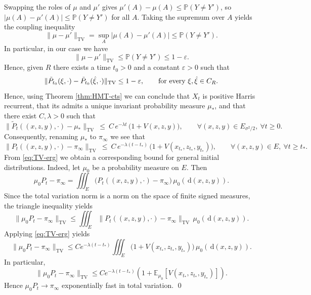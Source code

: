 \documentclass[11pt, a4paper,leqno]{amsart}
\theoremstyle{definition}
\numberwithin{equation}{section}
\def \d {{\delta}}
\renewcommand{\d}{\, \mathrm{d}} %
\begin{document}
Swapping the roles of $\mu$ and $\mu'$ gives $\mu'(A)-\mu(A)\le \mathbb P(Y\neq Y')$,
so $|\mu(A)-\mu'(A)|\le \mathbb P(Y\neq Y')$ for all $A$. Taking the supremum over
$A$ yields the coupling inequality
\[
\|\mu-\mu'\|_{\mathrm{TV}}
= \sup_{A} |\mu(A)-\mu'(A)|
\le \mathbb P(Y\neq Y').
\]
In particular, in our case we have
\[
\|\mu - \mu'\|_{\mathrm{TV}} \le \mathbb{P}(Y \neq Y') \le 1 - \varepsilon.
\]
Hence, given $R$ there  exists a time
\( t_0 > 0 \) and a constant \( \varepsilon > 0 \) such that
\begin{equation}\label{keycond+}
\| \tilde P_{t_0}(\xi, \cdot) - \tilde P_{t_0}(\hat\xi, \cdot) \|_{\mathrm{TV}} \le 1 - \varepsilon,\qquad\mbox{for every \( \xi, \hat \xi \in C_R \).}
\end{equation}
Hence, using Theorem \ref{thm:HMT-cts} we can conclude that $X_t$ is positive Harris recurrent, that its admits a unique invariant probability measure $\mu_\ast$, and that there exist $C,\lambda>0$ such that
\begin{equation}\label{eq:TV-ergprev}
\|\tilde P_t((x,z,y),\cdot)-\mu_\ast\|_{\mathrm{TV}}
\ \le\ C\,e^{-\lambda t}\,\bigl(1+V(x,z,y)\bigr),
\qquad \forall (x,z,y)\in E_{\sigma^2/2},\ \forall t\ge 0.
\end{equation}
Consequently, renaming $\mu_\ast$ to $\pi_\infty$ we see that
\begin{equation}\label{eq:TV-erg}
\| P_{t}((x,z,y),\cdot)-\pi_\infty\|_{\mathrm{TV}}
\ \le\ C\,e^{-\lambda (t-t_\ast)}\,\bigl(1+V(x_{t_\ast},z_{t_\ast},y_{t_\ast})\bigr),
\qquad \forall (x,z,y)\in E,\ \forall t\ge t_\ast.
\end{equation}
From \eqref{eq:TV-erg} we obtain a corresponding bound for general initial
distributions. Indeed, let \(\mu_0\) be a probability measure on \(E\). Then
\[
\mu_0P_t - \pi_\infty
=
\iiint_E \bigl(P_t((x,z,y),\cdot)-\pi_\infty\bigr)\,\mu_0(\d(x,z,y)).
\]
Since the total variation norm is a norm on the space of finite signed measures, the triangle inequality yields
\[
\|\mu_0P_t-\pi_\infty\|_{\mathrm{TV}}
\le
\iiint_E \|P_t((x,z,y),\cdot)-\pi_\infty\|_{\mathrm{TV}}\,
\mu_0(\d(x,z,y)).
\]
Applying \eqref{eq:TV-erg} yields
\[
\|\mu_0P_t-\pi_\infty\|_{\mathrm{TV}}
\le
C e^{-\lambda (t-t_\ast)}
\iiint_E \bigl(1+V(x_{t_\ast},z_{t_\ast},y_{t_\ast})\bigr)\,\mu_0(\d(x,z,y)).
\]
In particular,
\[
\|\mu_0P_t-\pi_\infty\|_{\mathrm{TV}}
\le
C e^{-\lambda (t-t_\ast)}(1+\mathbb E_{\mu_0}[V(x_{t_\ast},z_{t_\ast},y_{t_\ast})]).
\]
Hence \(\mu_0P_t \to \pi_\infty\) exponentially fast in total variation. \qed
\end{document}
